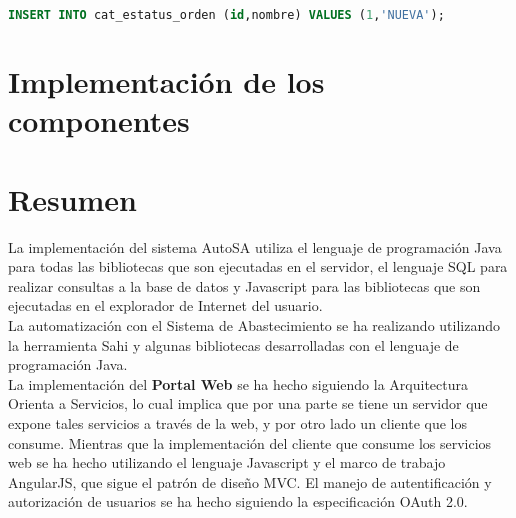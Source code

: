 \begin{lstlisting}[language=SQL, caption={Sentencia insertar un registro.}, captionpos=b, label={lst:sql-insert}]
INSERT INTO cat_estatus_orden (id,nombre) VALUES (1,'NUEVA');
\end{lstlisting}

%

\section{Implementación de los componentes}







%



%

\section{Resumen}
La implementación del sistema AutoSA utiliza el lenguaje de programación Java para todas las bibliotecas que son ejecutadas en el servidor, el lenguaje SQL para realizar consultas a la base de datos y Javascript para las bibliotecas que son ejecutadas en el explorador de Internet del usuario.\\
La automatización con el Sistema de Abastecimiento se ha realizando utilizando la herramienta Sahi y algunas bibliotecas desarrolladas con el lenguaje de programación Java.\\
La implementación del \textbf{Portal Web} se ha hecho siguiendo la Arquitectura Orienta a Servicios, lo cual implica que por una parte se tiene un servidor que expone tales servicios a través de la web, y por otro lado un cliente que los consume. Mientras que la implementación del cliente que consume los servicios web se ha hecho utilizando el lenguaje Javascript y el marco de trabajo AngularJS, que sigue el patrón de diseño MVC. El manejo de autentificación y autorización de usuarios se ha hecho siguiendo la especificación OAuth 2.0.
